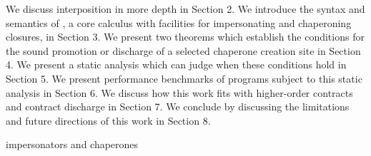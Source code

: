 \documentclass{sigplanconf}
\begin{document}



We discuss interposition in more depth in Section 2.
We introduce the syntax and semantics of \chapcalc, a core calculus with facilities for impersonating and chaperoning closures, in Section 3.
We present two theorems which establish the conditions for the sound promotion or discharge of a selected chaperone creation site in Section 4.
We present a static analysis which can judge when these conditions hold in Section 5.
We present performance benchmarks of programs subject to this static analysis in Section 6.
We discuss how this work fits with higher-order contracts and contract discharge in Section 7.
We conclude by discussing the limitations and future directions of this work in Section 8.


impersonators and chaperones
\end{document}
